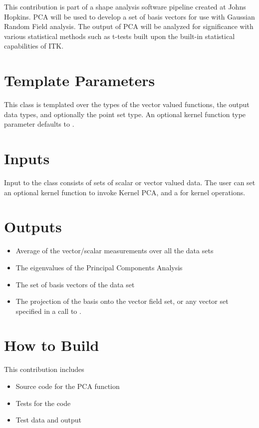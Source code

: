 \documentclass{InsightArticle}
\begin{document}
This contribution is part of a shape analysis software pipeline created
at Johns Hopkins.  PCA will be used to develop a set of
basis vectors for use with Gaussian Random Field analysis.  The output of PCA
will be analyzed for significance with various statistical methods such as
t-tests built upon the built-in statistical capabilities of ITK.


\section{Template Parameters}

This class is templated over the types of the vector valued functions,
the output data types, and optionally the point set type.  An optional kernel
function type parameter defaults to .

\section{Inputs}

Input to the class consists of sets of scalar or vector valued data.
The user can set an optional kernel
function to invoke Kernel PCA, and a  for
kernel operations.  

\section{Outputs}

\begin{itemize}
\item Average of the vector/scalar measurements over all the data sets
\item The eigenvalues of the Principal Components Analysis
\item The set of basis vectors of the data set
\item The projection of the basis onto the vector field set, or any vector set
specified in a call to .
\end{itemize}

\section{How to Build}

This contribution includes

\begin{itemize}
\item Source code for the PCA function
\item Tests for the code
\item Test data and output
\end{itemize}
\end{document}
